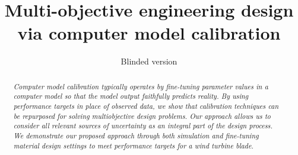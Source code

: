 \documentclass[twocolumn,10pt]{asme2ej}
\title{Multi-objective engineering design via computer model calibration}
\author{Blinded version
    \affiliation{
	for review}
    }
\begin{document}
\maketitle    

\begin{abstract}
{\it 
	Computer model calibration typically operates by fine-tuning parameter values in a computer model so that the model output faithfully predicts reality. 
	By using performance targets in place of observed data, we show that calibration techniques can be repurposed for solving multiobjective design problems.
	Our approach allows us to consider all relevant sources of uncertainty as an integral part of the design process.
	We demonstrate our proposed approach through both simulation and fine-tuning material design settings to meet performance targets for a wind turbine blade.
}
\end{abstract}
\end{document}
